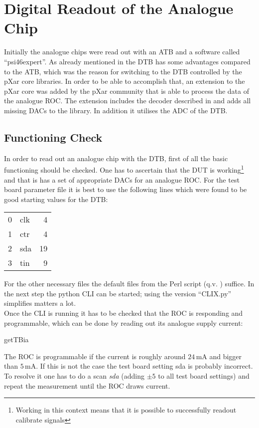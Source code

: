 \section{Digital Readout of the Analogue Chip}
Initially the analogue chips were read out with an \ac{ATB} and a software called ``psi46expert''. As already mentioned in  the \ac{DTB} has some advantages compared to the \ac{ATB}, which was the reason for switching to the \ac{DTB} controlled by the pXar core libraries. In order to be able to accomplish that, an extension to the pXar core was added by the pXar community that is able to process the data of the analogue \ac{ROC}. The extension includes the decoder described in  and adds all missing \ac{DAC}s to the library. In addition it utilises the \ac{ADC} of the \ac{DTB}.
\subsection{Functioning Check}
In order to read out an analogue chip with the \ac{DTB}, first of all the basic functioning should be checked. One has to ascertain that the \ac{DUT} is working\footnote{Working in this context means that it is possible to successfully readout calibrate signals} and that is has a set of appropriate \ac{DAC}s for an analogue \ac{ROC}. For the test board parameter file it is best to use the following lines which were found to be good starting values for the \ac{DTB}:\s
{\ubuntu
\begin{tabular}{llr}
	0	&   clk	&  4\\
	1	&	ctr	&  4\\
	2	&	sda	&  19\\
	3	&	tin	&  9
\end{tabular}}\no\s
For the other necessary files the default files from the Perl script (q.v. ) suffice. In the next step the python \ac{CLI} can be started; using the version ``CLIX.py'' simplifies matters a lot.\\
Once the \ac{CLI} is running it has to be checked that the \ac{ROC} is responding and programmable, which can be done by reading out its analogue supply current:
\begin{itemize}
	\tri getTBia
\end{itemize}
The \ac{ROC} is programmable if the current is roughly around $24\,$mA and bigger than $5\,$mA. If this is not the case the test board setting sda is probably incorrect. To resolve it one has to do a scan \textit{sda} (adding $\pm5$ to all test board settings) and repeat the measurement until the \ac{ROC} draws current.
